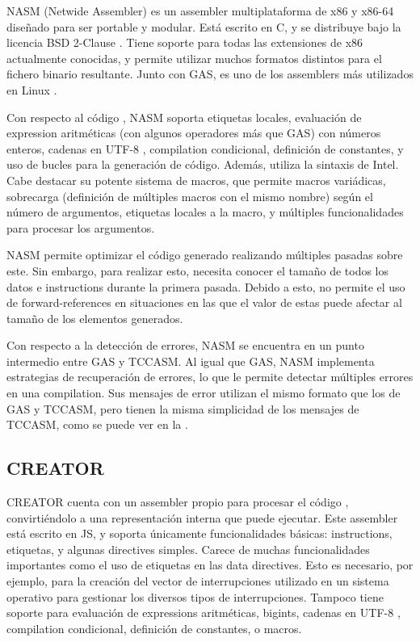 NASM (Netwide Assembler) \parencite{NASM} es un \gls{assembler} multiplataforma
de x86 y x86-64 diseñado para ser portable y modular. Está escrito en C, y se
distribuye bajo la licencia BSD 2-Clause \parencite{bsd-2c}. Tiene soporte para
todas las extensiones de x86 actualmente conocidas, y permite utilizar muchos
formatos distintos para el fichero binario resultante. Junto con \gls{GAS}, es
uno de los \glspl{assembler} más utilizados en Linux
\parencite{assembler-usage}.

Con respecto al código , NASM soporta etiquetas
locales, evaluación de \gls{expression} aritméticas (con algunos operadores más
que \gls{GAS}) con números enteros, cadenas en UTF-8 \parencite{UTF-8},
\gls{compilation} condicional, definición de constantes, y uso de bucles para la
generación de código. Además, utiliza la sintaxis de Intel. Cabe destacar su
potente sistema de \glspl{macro}, que permite \glspl{macro} variádicas,
sobrecarga (definición de múltiples \glspl{macro} con el mismo nombre) según el
número de argumentos, etiquetas locales a la \gls{macro}, y múltiples
funcionalidades para procesar los argumentos.

NASM permite optimizar el código generado realizando múltiples pasadas sobre
este. Sin embargo, para realizar esto, necesita conocer el tamaño de todos los
datos e \glspl{instruction} durante la primera pasada. Debido a esto, no permite
el uso de \glspl{forward-reference} en situaciones en las que el valor de estas
puede afectar al tamaño de los elementos generados. \parencite{NASM-manual}

Con respecto a la detección de errores, NASM se encuentra en un punto intermedio
entre \gls{GAS} y TCCASM. Al igual que \gls{GAS}, NASM implementa estrategias de
recuperación de errores, lo que le permite detectar múltiples errores en una
\gls{compilation}. Sus mensajes de error utilizan el mismo formato que los de
\gls{GAS} y TCCASM, pero tienen la misma simplicidad de los mensajes de TCCASM,
como se puede ver en la .


\subsection{CREATOR}

CREATOR \parencite{CREATOR} cuenta con un \gls{assembler} propio para procesar
el código , convirtiéndolo a una representación
interna que puede ejecutar. Este \gls{assembler} está escrito en \gls{JS}, y
soporta únicamente funcionalidades básicas: \glspl{instruction}, etiquetas,
y algunas \glspl{directive} simples. Carece de muchas funcionalidades importantes
como el uso de etiquetas en las \glspl{data directive}. Esto es necesario, por
ejemplo, para la creación del vector de interrupciones utilizado en un sistema
operativo para gestionar los diversos tipos de interrupciones. Tampoco tiene
soporte para evaluación de \glspl{expression} aritméticas, \glspl{bigint},
cadenas en UTF-8 \parencite{UTF-8}, \gls{compilation} condicional, definición de
constantes, o \glspl{macro}.

